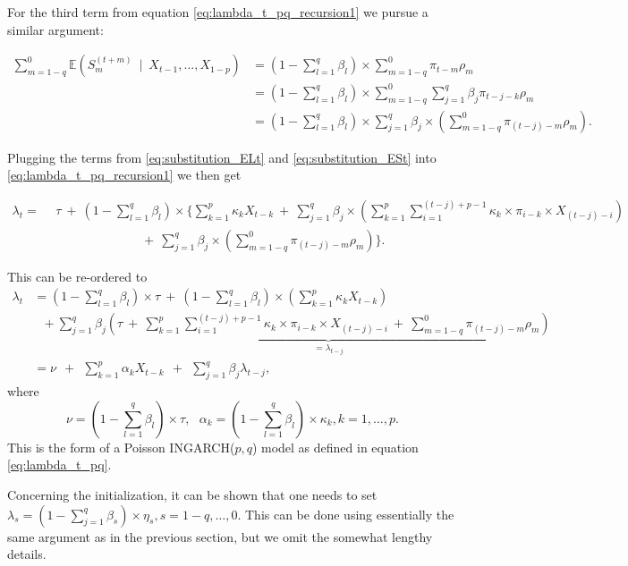 \documentclass[review]{elsarticle}
\begin{document}
For the third term from equation \eqref{eq:lambda_t_pq_recursion1} we pursue a similar argument:

\begin{align}
\sum_{m = 1 - q}^0 \mathbb{E}(S_{m}^{(t + m)}  \ \mid \ X_{t - 1}, \dots, X_{1 - p}) & = \left(1 - \sum_{l = 1}^q \beta_l\right) \times \sum_{m = 1 - q}^0 \pi_{t - m}\rho_m\nonumber\\
& = \left(1 - \sum_{l = 1}^q \beta_l\right) \times \sum_{m = 1 - q}^0 \sum_{j = 1}^q \beta_j \pi_{t - j - k}\rho_m\nonumber\\
& =  \left(1 - \sum_{l = 1}^q \beta_l\right) \times\sum_{j = 1}^q \beta_j \times \left(\sum_{m = 1 - q}^0 \pi_{(t - j) - m}\rho_m\right).\label{eq:substitution_ESt}
\end{align}

Plugging the terms from \eqref{eq:substitution_ELt} and \eqref{eq:substitution_ESt} into \eqref{eq:lambda_t_pq_recursion1} we then get

\begin{align*}
\lambda_t = & \ \ \tau \ + \ \left(1 - \sum_{l = 1}^q \beta_l\right) \times \Bigg\{\sum_{k = 1}^p \kappa_k X_{t - k} \ + \ \sum_{j = 1}^q \beta_j \times \left(\sum_{k = 1}^p \sum_{i = 1}^{(t - j) + p - 1} \kappa_k \times \pi_{i - k} \times X_{(t - j) - i}\right) \\
& \ \ \ \ \ \ \ \ \ \ \ \ \ \ \ \ \ \ \ \ \ \  \ \ \ \ \ \ \ \ \ \ \ + \ \sum_{j = 1}^q \beta_j \times \left(\sum_{m = 1 - q}^0 \pi_{(t - j) - m}\rho_m\right)\Bigg\}.
\end{align*}

This can be re-ordered to
\begin{align*}
\lambda_t & = \left(1 - \sum_{l = 1}^q \beta_l\right) \times \tau \ + \ \left(1 - \sum_{l = 1}^q \beta_l\right) \times \left(\sum_{k = 1}^p \kappa_k X_{t - k}\right)\\
& \ \ \ + \sum_{j = 1}^q \beta_j \underbrace{\left(\tau \ + \  \sum_{k = 1}^p \sum_{i = 1}^{(t - j) + p - 1} \kappa_k \times \pi_{i - k} \times X_{(t - j) - i} \ + \ \sum_{m = 1 - q}^0 \pi_{(t - j) - m}\rho_m \right)}_{= \lambda_{t - j}}\\
& = \nu \ \ + \ \ \sum_{k = 1}^p \alpha_k X_{t - k} \ \ + \ \ \sum_{j = 1}^q \beta_j \lambda_{t - j},
\end{align*}
where
$$
\nu = \left(1 - \sum_{l = 1}^q \beta_l\right) \times \tau, \ \ \ \alpha_k = \left(1 - \sum_{l = 1}^q \beta_l\right) \times \kappa_k, k = 1, \dots, p.
$$
This is the form of a Poisson INGARCH($p, q$) model as defined in equation \eqref{eq:lambda_t_pq}.

Concerning the initialization, it can be shown that one needs to set $\lambda_s = (1 - \sum_{j = 1}^q\beta_s) \times \eta_s, s = 1 - q, \dots, 0$. This can be done using essentially the same argument as in the previous section, but we omit the somewhat lengthy details.
\end{document}
